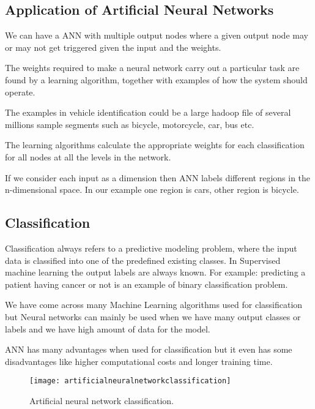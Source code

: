 	\subsection{Application of Artificial Neural Networks}

	\begin{bulletedlist}
		\item We can have a ANN with multiple output nodes where a given output node may or may not get triggered given the input and the weights.
		\item The weights required to make a neural network carry out a particular task are found by a learning algorithm, together with  examples of how the system  should operate.
		\item The examples in vehicle identification could be a large hadoop file of several millions sample segments such as bicycle, motorcycle, car, bus etc.
		\item The learning algorithms calculate the appropriate weights for each classification for all nodes at all the levels in the network.
		\item If we consider each input as a dimension then ANN labels different regions in the n-dimensional space. In our example one region is cars, other region is bicycle.
	\end{bulletedlist}

	\subsection{Classification}
	\begin{bulletedlist}
		\item Classification always refers to a predictive modeling problem, where the input data is classified into one of the predefined existing classes. In Supervised machine learning the output labels are always known. For example: predicting a patient having cancer or not is an example of binary classification problem.
		\item We have come across many Machine Learning algorithms used for classification but Neural networks can mainly be used when we have many output classes or labels and we have high amount of data for the model.
		\item ANN has many advantages when used for classification but it even has some disadvantages like higher computational costs and longer training time.
	\end{bulletedlist}

 	\begin{figure}[htb]
		\centering
		\texttt{[image: artificialneuralnetworkclassification]}
		\caption[Artificial neural network classification]{Artificial neural network classification.}
		\label{fig:artificialneuralnetworkclassification}
	\end{figure}

